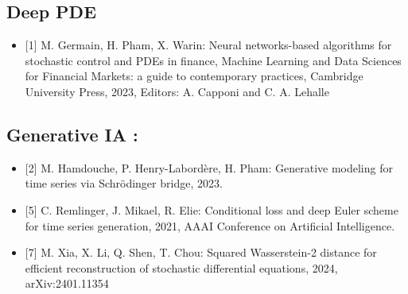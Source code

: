\documentclass[
  10,
  letterpaper,
  DIV=11,
  numbers=noendperiod]{scrreport}
\providecommand{\tightlist}{%
  \setlength{\itemsep}{0pt}\setlength{\parskip}{0pt}}\usepackage{longtable,booktabs,array}
\theoremstyle{definition}
\theoremstyle{remark}
\begin{document}
\subsection*{Deep PDE}\label{deep-pde}

\begin{itemize}
\tightlist
\item
  {[}1{]} M. Germain, H. Pham, X. Warin: Neural networks-based
  algorithms for stochastic control and PDEs in finance, Machine
  Learning and Data Sciences for Financial Markets: a guide to
  contemporary practices, Cambridge University Press, 2023, Editors: A.
  Capponi and C. A. Lehalle
\end{itemize}

\subsection*{Generative IA :}\label{generative-ia-1}

\begin{itemize}
\item
  {[}2{]} M. Hamdouche, P. Henry-Labordère, H. Pham: Generative modeling
  for time series via Schrödinger bridge, 2023.
\item
  {[}5{]} C. Remlinger, J. Mikael, R. Elie: Conditional loss and deep
  Euler scheme for time series generation, 2021, AAAI Conference on
  Artificial Intelligence.
\item
  {[}7{]} M. Xia, X. Li, Q. Shen, T. Chou: Squared Wasserstein-2
  distance for efficient reconstruction of stochastic differential
  equations, 2024, arXiv:2401.11354
\end{itemize}
\end{document}
